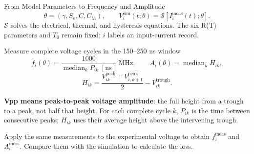 \begin{frame}{From Model Parameters to Frequency and Amplitude}
\small
\[
\theta=(\gamma,S_e,C,C_{th}),\qquad
V_i^{\mathrm{sim}}(t;\theta)=\mathcal S[I_i^{\mathrm{meas}}(t);\theta].
\]
\(\mathcal S\) solves the electrical, thermal, and hysteresis equations.
The six R(T) parameters and \(T_0\) remain fixed; \(i\) labels an input-current record.
\begin{block}{Measure complete voltage cycles in the 150--250 ns window}
\[
f_i(\theta)=\frac{1000}{\operatorname{median}_k P_{ik}\;[\mathrm{ns}]}\;\mathrm{MHz},
\qquad A_i(\theta)=\operatorname{median}_k H_{ik},
\]
\[
H_{ik}=\frac{V_{ik}^{\mathrm{peak}}+V_{i,k+1}^{\mathrm{peak}}}{2}
-V_{ik}^{\mathrm{trough}}.
\]
\end{block}
\footnotesize
\textbf{Vpp means peak-to-peak voltage amplitude}: the full height from a trough to a peak, not half that height.
For each complete cycle \(k\), \(P_{ik}\) is the time between consecutive peaks;
\(H_{ik}\) uses their average height above the intervening trough.
\par\vspace{0.14cm}
Apply the same measurements to the experimental voltage to obtain
\(f_i^{\mathrm{meas}}\) and \(A_i^{\mathrm{meas}}\). Compare them with the simulation to calculate the loss.
\end{frame}


